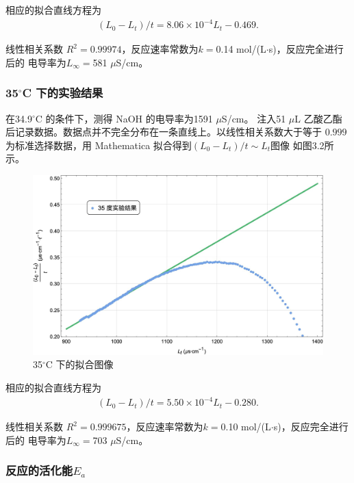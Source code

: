 \documentclass[12pt]{ctexart}
\numberwithin{equation}{section}
\begin{document}
相应的拟合直线方程为
\begin{align}
    (L_0 - L_t)/t = 8.06 \times 10^{-4} L_t - 0.469.
\end{align}

线性相关系数 $R^2 = 0.99974$，反应速率常数为$k = $0.14 mol/(L$\cdot$s)，反应完全进行后的
电导率为$L_\infty = $581 $\mu$S/cm。

\subsubsection{\texorpdfstring{35$^\circ$C 下的实验结果}{35 度下的实验结果}}

在34.9$^\circ$C 的条件下，测得 NaOH 的电导率为1591 $\mu$S/cm。
注入51 $\mu$L 乙酸乙酯后记录数据。数据点并不完全分布在一条直线上。以线性相关系数大于等于 $0.999$ 为标准选择数据，用 Mathematica 拟合得到$(L_0 - L_t)/t \sim L_t$图像
如图3.2所示。
\begin{figure}[!h]
    \centering
    \includegraphics[scale=0.45]{35degree.jpg}
    \caption{35$^\circ$C 下的拟合图像}
\end{figure}

相应的拟合直线方程为
\begin{align}
    (L_0 - L_t)/t = 5.50 \times 10^{-4} L_t - 0.280.
\end{align}

线性相关系数 $R^2 = 0.999675$，反应速率常数为$k = $0.10 mol/(L$\cdot$s)，反应完全进行后的
电导率为$L_\infty = $703 $\mu$S/cm。

\subsubsection{\texorpdfstring{反应的活化能$E_a$}{反应的活化能}}
\end{document}
